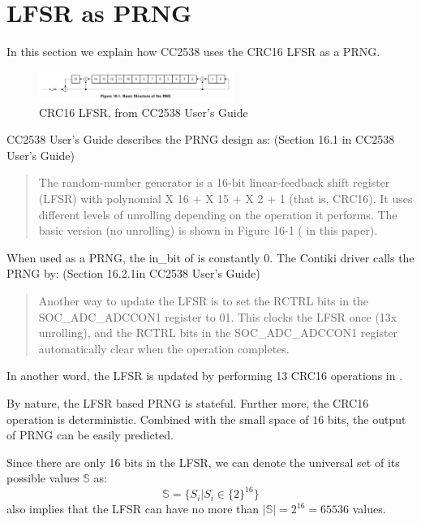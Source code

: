 \section{LFSR as PRNG} \label{LFSR}
In this section we explain how CC2538 uses the CRC16 LFSR as a PRNG. 

\begin{figure}[!t]
\centering
\includegraphics[width=2.5in]{fig/crc16.png}
\caption{CRC16 LFSR, from CC2538 User's Guide}
\label{CRC16}
\end{figure}

CC2538 User's Guide describes the PRNG design as: (Section 16.1 in CC2538 User's Guide)
\begin{quote}
The random-number generator is a 16-bit linear-feedback shift register (LFSR) with polynomial X 16 + X 15 +
X 2 + 1 (that is, CRC16). It uses different levels of unrolling depending on the operation it performs. The basic version (no unrolling) is shown in Figure 16-1 ( in this paper).
\end{quote}

When used as a PRNG, the in\_bit of  is constantly $0$. The Contiki driver calls the PRNG by: (Section 16.2.1in CC2538 User's Guide)
\begin{quote}
Another way to update the LFSR is to set the RCTRL bits in the SOC\_ADC\_ADCCON1 register to 01. This clocks the LFSR once (13x unrolling), and the RCTRL bits in the SOC\_ADC\_ADCCON1 register automatically clear when the operation completes.
\end{quote}

In another word, the LFSR is updated by performing 13 CRC16 operations in .

By nature, the LFSR based PRNG is stateful. Further more, the CRC16 operation is deterministic. Combined with the small space of $16$ bits, the output of PRNG can be easily predicted.

Since there are only 16 bits in the LFSR, we can denote the universal set of its  possible values $\mathbb{S}$ as:
\begin{equation} \label{PRNGState}
\mathbb{S} = \{ S_{i} | S_{i} \in \{2\}^{16}\}
\end{equation}
 also implies that the LFSR can have no more than $|\mathbb{S}| = 2^{16} = 65536$ values.

